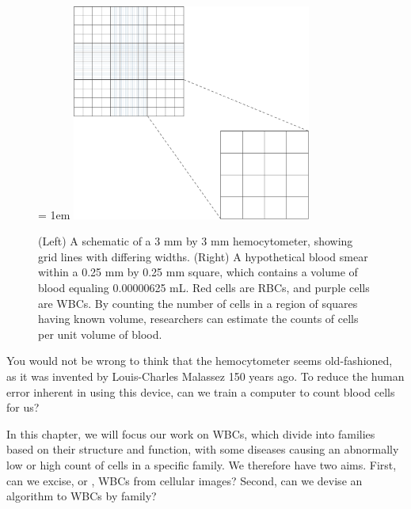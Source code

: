 \begin{figure}[h]
\centering
\tabcolsep = 1em
\mySfFamily
\includegraphics[width = 0.7\textwidth]{../images/hemocytometer.png}
\caption{(Left) A schematic of a 3 mm by 3 mm hemocytometer, showing grid lines with differing widths. (Right) A hypothetical blood smear within a 0.25 mm by 0.25 mm square, which contains a volume of blood equaling 0.00000625 mL. Red cells are RBCs, and purple cells are WBCs. By counting the number of cells in a region of squares having known volume, researchers can estimate the counts of cells per unit volume of blood.}
\label{fig:hemocytometer}
\end{figure}

\begin{qbox}\end{qbox}

You would not be wrong to think that the hemocytometer seems old-fashioned, as it was invented by Louis-Charles Malassez 150 years ago. To reduce the human error inherent in using this device, can we train a computer to count blood cells for us?

In this chapter, we will focus our work on WBCs, which divide into families based on their structure and function, with some diseases causing an abnormally low or high count of cells in a specific family. We therefore have two aims. First, can we excise, or , WBCs from cellular images?  Second, can we devise an algorithm to  WBCs by family?

